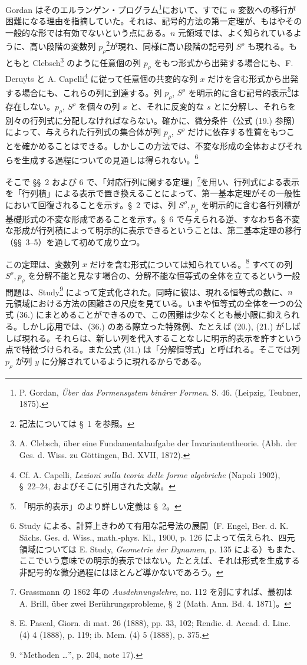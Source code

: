 \documentclass[11pt]{article}
\begin{document}
Gordan はそのエルランゲン・プログラム\footnote{P. Gordan, \emph{Über das Formensystem binärer Formen}. S. 46. (Leipzig, Teubner, 1875).}において、すでに $n$ 変数への移行が困難になる理由を指摘していた。それは、記号的方法の第一定理が、もはやその一般的な形では有効でないという点にある。$n$ 元領域では、よく知られているように、高い段階の変数列 $p_\rho$\footnote{記法については \S\ 1 を参照。}が現れ、同様に高い段階の記号列 $S^\rho$ も現れる。もともと Clebsch\footnote{A. Clebsch, über eine Fundamentalaufgabe der Invariantentheorie. (Abh. der Ges. d. Wiss. zu Göttingen, Bd. XVII, 1872).} のように任意個の列 $p_\rho$ をもつ形式から出発する場合にも、F. Deruyts と A. Capelli\footnote{Cf. A. Capelli, \emph{Lezioni sulla teoria delle forme algebriche} (Napoli 1902), \S\ 22--24, およびそこに引用された文献。} に従って任意個の共変的な列 $x$ だけを含む形式から出発する場合にも、これらの列に到達する。列 $p_\rho$, $S^\rho$ を明示的に含む記号的表示\footnote{「明示的表示」のより詳しい定義は \S\ 2。}は存在しない。$p_\rho$, $S^\rho$ を個々の列 $x$ と、それに反変的な $s$ とに分解し、それらを別々の行列式に分配しなければならない。確かに、微分条件（公式 (19.) 参照）によって、与えられた行列式の集合体が列 $p_\rho$, $S^\rho$ だけに依存する性質をもつことを確かめることはできる。しかしこの方法では、不変な形成の全体およびそれらを生成する過程についての見通しは得られない。\footnote{Study による、計算上きわめて有用な記号法の展開（F. Engel, Ber. d. K. Sächs. Ges. d. Wiss., math.-phys. Kl., 1900, p. 126 によって伝えられ、四元領域については E. Study, \emph{Geometrie der Dynamen}, p. 135 による）もまた、ここでいう意味での明示的表示ではない。たとえば、それは形式を生成する非記号的な微分過程にはほとんど導かないであろう。}

そこで \S\S\ 2 および 6 で、「対応行列に関する定理」\footnote{Grassmann の 1862 年の \emph{Ausdehnungslehre}, no. 112 を別にすれば、最初は A. Brill, über zwei Berührungsprobleme, \S\ 2 (Math. Ann. Bd. 4. 1871)。}を用い、行列式による表示を「行列積」による表示で置き換えることによって、第一基本定理がその一般性において回復されることを示す。\S\ 2 では、列 $S^\rho,p_\rho$ を明示的に含む各行列積が基礎形式の不変な形成であることを示す。\S\ 6 で与えられる逆、すなわち各不変な形成が行列積によって明示的に表示できるということは、第二基本定理の移行（\S\S\ 3--5）を通して初めて成り立つ。

この定理は、変数列 $x$ だけを含む形式については知られている。\footnote{E. Pascal, Giorn. di mat. 26 (1888), pp. 33, 102; Rendic. d. Accad. d. Linc. (4) 4 (1888), p. 119; ib. Mem. (4) 5 (1888), p. 375.} すべての列 $S^\rho,p_\rho$ を分解不能と見なす場合の、分解不能な恒等式の全体を立てるという一般問題は、Study\footnote{``Methoden \dots'', p. 204, note 17).} によって定式化された。同時に彼は、現れる恒等式の数に、$n$ 元領域における方法の困難さの尺度を見ている。いまや恒等式の全体を一つの公式 (36.) にまとめることができるので、この困難は少なくとも最小限に抑えられる。しかし応用では、(36.) のある際立った特殊例、たとえば (20.), (21.) がしばしば現れる。それらは、新しい列を代入することなしに明示的表示を許すという点で特徴づけられる。また公式 (31.) は「分解恒等式」と呼ばれる。そこでは列 $p_\rho$ が列 $y$ に分解されているように現れるからである。
\end{document}
